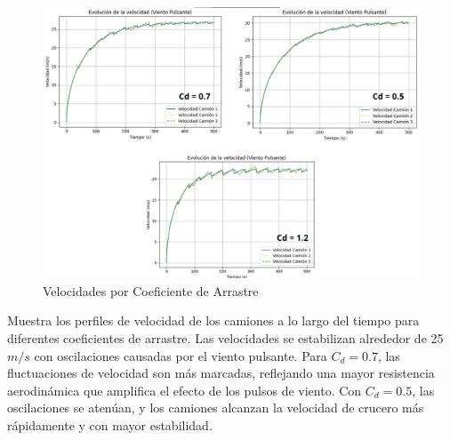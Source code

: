 \documentclass[11pt,stdletter,orderfromtodate,sigleft,twoside]{report}
\begin{document}
\begin{enumerate}
\begin{figure}[H]
    \centering
    \includegraphics[width=0.75\linewidth]{figures//Cars/var vel punz cd.png}
    \caption{Velocidades por Coeficiente de Arrastre}
    \label{fig:enter-label}
\end{figure}
Muestra los perfiles de velocidad de los camiones a lo largo del tiempo para diferentes coeficientes de arrastre. Las velocidades se estabilizan alrededor de 25 $m/s $ con oscilaciones causadas por el viento pulsante. Para $C_d = 0.7$, las fluctuaciones de velocidad son más marcadas, reflejando una mayor resistencia aerodinámica que amplifica el efecto de los pulsos de viento. Con $C_d = 0.5$, las oscilaciones se atenúan, y los camiones alcanzan la velocidad de crucero más rápidamente y con mayor estabilidad.



\end{enumerate}
\end{document}
